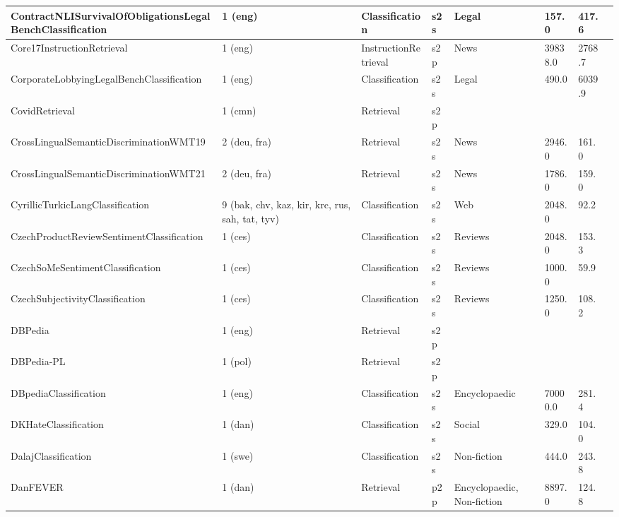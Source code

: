 \begin{longtable}{L{5.0cm}|L{1.5cm}L{1.4cm}L{1.4cm}L{1.4cm}L{1.4cm}L{1.0cm}L{1.0cm}}
 \hline 
ContractNLISurvivalOfObligationsLegalBenchClassification \cite{guha2023legalbench} & 1 (eng) & Classification & s2s & Legal & 157.0 & 417.6 \\
 \hline 
Core17InstructionRetrieval \cite{weller2024followir} & 1 (eng) & InstructionRetrieval & s2p & News & 39838.0 & 2768.7 \\
 \hline 
CorporateLobbyingLegalBenchClassification \cite{guha2023legalbench} & 1 (eng) & Classification & s2s & Legal & 490.0 & 6039.9 \\
 \hline 
CovidRetrieval  & 1 (cmn) & Retrieval & s2p &  &  &  \\
 \hline 
CrossLingualSemanticDiscriminationWMT19  & 2 (deu, fra) & Retrieval & s2s & News & 2946.0 & 161.0 \\
 \hline 
CrossLingualSemanticDiscriminationWMT21  & 2 (deu, fra) & Retrieval & s2s & News & 1786.0 & 159.0 \\
 \hline 
CyrillicTurkicLangClassification \cite{goldhahn2012building} & 9 (bak, chv, kaz, kir, krc, rus, sah, tat, tyv) & Classification & s2s & Web & 2048.0 & 92.2 \\
 \hline 
CzechProductReviewSentimentClassification \cite{habernal-etal-2013-sentiment} & 1 (ces) & Classification & s2s & Reviews & 2048.0 & 153.3 \\
 \hline 
CzechSoMeSentimentClassification \cite{habernal-etal-2013-sentiment} & 1 (ces) & Classification & s2s & Reviews & 1000.0 & 59.9 \\
 \hline 
CzechSubjectivityClassification \cite{priban-steinberger-2022-czech} & 1 (ces) & Classification & s2s & Reviews & 1250.0 & 108.2 \\
 \hline 
DBPedia \cite{Hasibi:2017:DVT} & 1 (eng) & Retrieval & s2p &  &  &  \\
 \hline 
DBPedia-PL \cite{Hasibi:2017:DVT} & 1 (pol) & Retrieval & s2p &  &  &  \\
 \hline 
DBpediaClassification \cite{NIPS2015_250cf8b5} & 1 (eng) & Classification & s2s & Encyclopaedic & 70000.0 & 281.4 \\
 \hline 
DKHateClassification \cite{sigurbergsson-derczynski-2020-offensive} & 1 (dan) & Classification & s2s & Social & 329.0 & 104.0 \\
 \hline 
DalajClassification \cite{2105.06681} & 1 (swe) & Classification & s2s & Non-fiction & 444.0 & 243.8 \\
 \hline 
DanFEVER \cite{norregaard-derczynski-2021-danfever} & 1 (dan) & Retrieval & p2p & Encyclopaedic, Non-fiction & 8897.0 & 124.8 \\

\end{longtable}
